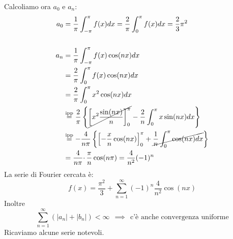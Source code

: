 Calcoliamo ora $a_{0}$ e $a_{n}$:
\begin{align*}
a_{0} & =\frac{1}{\pi }\int ^{\pi }_{-\pi } f(x)dx=\frac{2}{\pi }\int ^{\pi }_{0} f(x)dx=\frac{2}{3} \pi ^{2}\\
 & \\
a_{n} & =\frac{1}{\pi }\int ^{\pi }_{-\pi } f(x)\cos( nx) dx\\
 & =\frac{2}{\pi }\int ^{\pi }_{0} f(x)\cos (nx)dx\\
 & =\frac{2}{\pi }\int ^{\pi }_{0} x^{2}\cos (nx)dx\\
 & \overset{\text{ipp}}{=}\frac{2}{\pi }\left\{\cancel{\left[ x^{2}\frac{\sin (nx)}{n}\right]^{\pi }_{0}} -\frac{2}{n}\int ^{\pi }_{0} x\sin (nx)dx\right\}\\
 & \overset{\text{ipp}}{=} -\frac{4}{n\pi }\left\{\left[ -\frac{x}{n}\cos( nx)\right]^{\pi }_{0} +\cancel{\frac{1}{n}\int ^{\pi }_{0}\cos( nx) dx}\right\}\\
 & =\frac{4}{n\pi } \cdotp \frac{\pi }{n}\cos( n\pi ) =\frac{4}{n^{2}}( -1)^{n}
\end{align*}
La serie di Fourier cercata è:
\begin{equation*}
f(x)=\frac{\pi ^{2}}{3} +\sum ^{\infty }_{n=1} (-1)^{n}\frac{4}{n^{2}}\cos (nx)
\end{equation*}
Inoltre
\begin{equation*}
\sum ^{\infty }_{n=1}( |a_{n} |+|b_{n} |) < \infty \ \ \implies \ \ \text{c'è anche convergenza uniforme}
\end{equation*}
Ricaviamo alcune serie notevoli.
